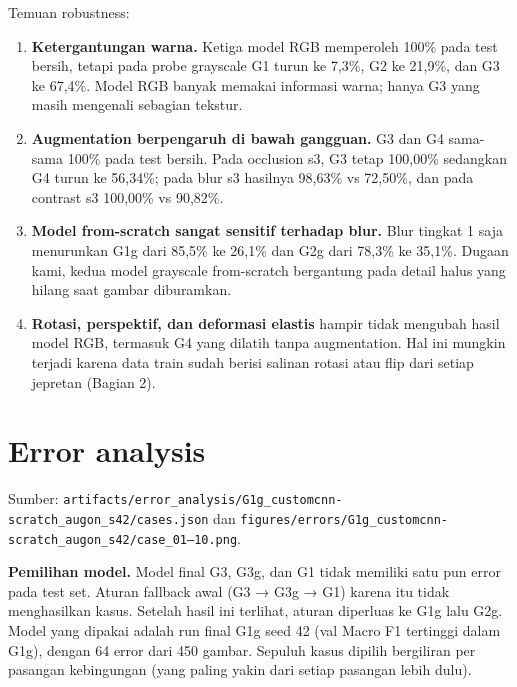 \documentclass[10pt,a4paper]{article}
\providecommand{\tightlist}{\setlength{\itemsep}{2pt}\setlength{\parskip}{0pt}}
\begin{document}
Temuan robustness:

\begin{enumerate}
\def\labelenumi{\arabic{enumi}.}
\tightlist
\item
  \textbf{Ketergantungan warna.} Ketiga model RGB memperoleh 100\% pada test bersih, tetapi pada probe grayscale G1 turun ke 7,3\%, G2 ke 21,9\%, dan G3 ke 67,4\%. Model RGB banyak memakai informasi warna; hanya G3 yang masih mengenali sebagian tekstur.
\item
  \textbf{Augmentation berpengaruh di bawah gangguan.} G3 dan G4 sama-sama 100\% pada test bersih. Pada occlusion s3, G3 tetap 100,00\% sedangkan G4 turun ke 56,34\%; pada blur s3 hasilnya 98,63\% vs 72,50\%, dan pada contrast s3 100,00\% vs 90,82\%.
\item
  \textbf{Model from-scratch sangat sensitif terhadap blur.} Blur tingkat 1 saja menurunkan G1g dari 85,5\% ke 26,1\% dan G2g dari 78,3\% ke 35,1\%. Dugaan kami, kedua model grayscale from-scratch bergantung pada detail halus yang hilang saat gambar diburamkan.
\item
  \textbf{Rotasi, perspektif, dan deformasi elastis} hampir tidak mengubah hasil model RGB, termasuk G4 yang dilatih tanpa augmentation. Hal ini mungkin terjadi karena data train sudah berisi salinan rotasi atau flip dari setiap jepretan (Bagian 2).
\end{enumerate}

\section{Error analysis}\label{error-analysis}

Sumber: \texttt{artifacts/\allowbreak{}error\_\allowbreak{}analysis/\allowbreak{}G1g\_\allowbreak{}customcnn-\allowbreak{}scratch\_\allowbreak{}augon\_\allowbreak{}s42/\allowbreak{}cases.json} dan
\texttt{figures/\allowbreak{}errors/\allowbreak{}G1g\_\allowbreak{}customcnn-\allowbreak{}scratch\_\allowbreak{}augon\_\allowbreak{}s42/\allowbreak{}case\_\allowbreak{}01–10.png}.

\textbf{Pemilihan model.} Model final G3, G3g, dan G1 tidak memiliki satu pun error pada
test set. Aturan fallback awal (G3 → G3g → G1) karena itu tidak menghasilkan kasus.
Setelah hasil ini terlihat, aturan diperluas ke G1g lalu G2g. Model yang dipakai
adalah run final G1g seed 42 (val Macro F1 tertinggi dalam G1g), dengan 64 error
dari 450 gambar. Sepuluh kasus dipilih bergiliran per pasangan kebingungan (yang
paling yakin dari setiap pasangan lebih dulu).
\end{document}
